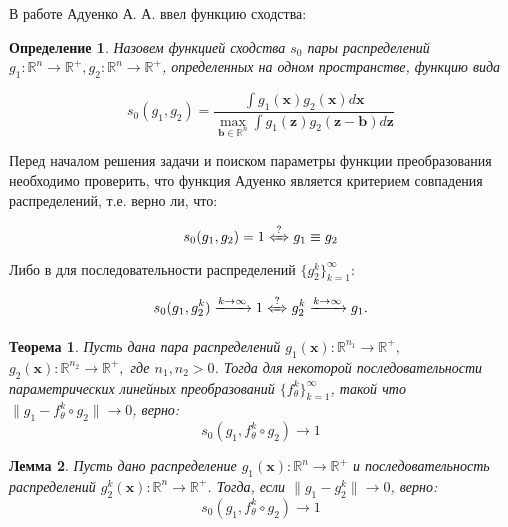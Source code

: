\documentclass[12pt]{extarticle}
\newtheorem{theorem}{Теорема}
\newtheorem{lemma}[theorem]{Лемма}
\newtheorem{definition}{Определение}
\newcommand{\bfx}{\mathbf{x}}
\newcommand{\bfz}{\mathbf{z}}
\newcommand{\bfb}{\mathbf{b}}
\newcommand{\bbr}{\mathbb{R}}
\begin{document}
В работе \cite{Aduenko_article} Адуенко А. А. ввел функцию сходства:
\begin{definition}
    Назовем функцией сходства $s_0$ пары распределений $g_1 : \bbr^n \to \bbr^{+}, g_2 : \bbr^n \to \bbr^{+}$, определенных на одном пространстве, функцию вида
    
    $$s_0(g_1, g_2) = \frac{\int g_1(\bfx)g_2(\bfx) d\bfx}{\max_{\bfb\in\bbr^n} \int g_1(\bfz)g_2 (\bfz - \bfb)d\bfz}$$ 
\end{definition}


Перед началом решения задачи и поиском параметры функции преобразования необходимо проверить, что функция Адуенко является критерием совпадения распределений, т.е. верно ли, что:

$$s_0(g_1, g_2) = 1 \xLeftrightarrow{?}  g_1 \equiv g_2$$
Либо в для последовательности распределений $\{g^k_2\}^\infty_{k=1}$:

\begin{equation}
    \label{aduenko_criteria}
    s_0(g_1, g^k_2) \xrightarrow[]{k\to \infty} 1 \xLeftrightarrow{?}  g^k_2 \xrightarrow[]{k\to \infty} g_1.
\end{equation}

\begin{theorem}
\label{th:Aduenko_necessary} 
Пусть дана пара распределений $g_1(\bfx): \mathbb{R}^{n_1} \to \mathbb{R}^+,$ $g_2(\bfx): \mathbb{R}^{n_2} \to \mathbb{R}^+,$ где $n_1, n_2 > 0$. Тогда для некоторой последовательности параметрических линейных преобразований $\{f^k_{\theta}\}^\infty_{k=1}$, такой что $\|g_1 - f^k_\theta\circ g_2\| \to 0$, верно:
$$ s_0(g_1,f^k_\theta\circ g_2) \to 1$$
\end{theorem}

\begin{lemma}
\label{lem:Aduenko_necessary} 
Пусть дано распределение $g_1(\bfx): \bbr^{n} \to \bbr^+$ и последовательность распределений $g^k_2(\bfx): \bbr^{n} \to \mathbb{R}^+$. 
Тогда, если $\|g_1 - g^k_2\| \to 0$, верно:
$$ s_0(g_1,f^k_\theta\circ g_2) \to 1$$
\end{lemma}
\end{document}

